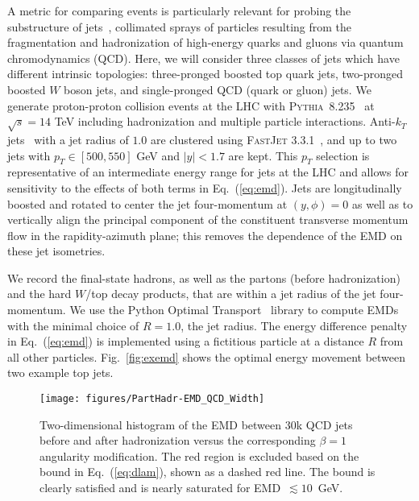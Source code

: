 \documentclass[aps,prl,twocolumn,preprintnumbers,nofootinbib,longbibliography,floatfix]{revtex4-1}
\DeclareRobustCommand{\Fig}[1]{Fig.~\ref{#1}}
\DeclareRobustCommand{\Eq}[1]{Eq.~(\ref{#1})}
\begin{document}
A metric for comparing events is particularly relevant for probing the substructure of jets~\cite{Seymour:1991cb,Seymour:1993mx,Butterworth:2002tt,Butterworth:2007ke,Butterworth:2008iy,Abdesselam:2010pt,Altheimer:2012mn,Altheimer:2013yza,Adams:2015hiv,Larkoski:2017jix,Asquith:2018igt}, collimated sprays of particles resulting from the fragmentation and hadronization of high-energy quarks and gluons via quantum chromodynamics (QCD).
%
Here, we will consider three classes of jets which have different intrinsic topologies: three-pronged boosted top quark jets, two-pronged boosted $W$ boson jets, and single-pronged QCD (quark or gluon) jets.
%
We generate proton-proton collision events at the LHC with \textsc{Pythia}~8.235~\cite{Sjostrand:2014zea} at $\sqrt{s}=14$ TeV including hadronization and multiple particle interactions.
%
Anti-$k_T$ jets~\cite{Cacciari:2008gp} with a jet radius of $1.0$ are clustered using \textsc{FastJet} 3.3.1~\cite{Cacciari:2011ma}, and up to two jets with $p_T\in[500,550]$ GeV and $|y|<1.7$ are kept.
%
This $p_T$ selection is representative of an intermediate energy range for jets at the LHC and allows for sensitivity to the effects of both terms in \Eq{eq:emd}.
%
Jets are longitudinally boosted and rotated to center the jet four-momentum at $(y,\phi) = 0$ as well as to vertically align the principal component of the constituent transverse momentum flow in the rapidity-azimuth plane; this removes the dependence of the EMD on these jet isometries.


We record the final-state hadrons, as well as the partons (before hadronization) and the hard $W$/top decay products, that are within a jet radius of the jet four-momentum.
%
We use the Python Optimal Transport~\cite{flamary2017pot} library to compute EMDs with the minimal choice of $R=1.0$, the jet radius.
%
The energy difference penalty in \Eq{eq:emd} is implemented using a fictitious particle at a distance $R$ from all other particles.
%
\Fig{fig:exemd} shows the optimal energy movement between two example top jets.


\begin{figure}[t]
\centering
\texttt{[image: figures/PartHadr-EMD\_QCD\_Width]}
\caption{Two-dimensional histogram of the EMD between 30k QCD jets before and after hadronization versus the corresponding $\beta=1$ angularity modification.
%
The red region is excluded based on the bound in \Eq{eq:dlam}, shown as a dashed red line.
%
The bound is clearly satisfied and is nearly saturated for EMD~$\lesssim10$~GeV.}
\label{fig:angemd}
\end{figure} 
\end{document}
